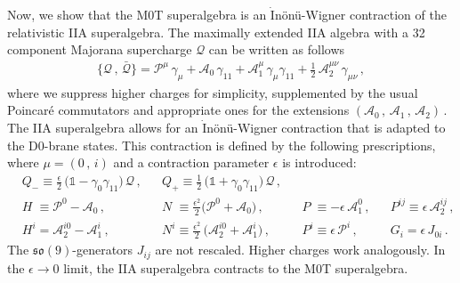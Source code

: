 \documentclass[11pt]{article}
\begin{document}
Now, we show that the M0T superalgebra is an $\dot{\text{I}}$nönü-Wigner contraction of the relativistic IIA superalgebra. The maximally extended IIA algebra with a 32 component Majorana supercharge $\mathcal{Q}$ can be written as follows \cite{Townsend:1997wg}
% 
\begin{align} \label{eq:IIAsuperalgebra}
    \big\{\mathcal{Q}\,,\,\bar{\mathcal{Q}}\big\} = \mathcal{P}^\mu \, \gamma^{}_\mu + \mathcal{A}^{}_0 \, \gamma^{}_{11} + \mathcal{A}_1^\mu \, \gamma^{}_\mu \gamma^{}_{11} + \tfrac12\,\mathcal{A}_2^{\mu\nu}\, \gamma_{\mu\nu}\,,
\end{align}
%
where we suppress higher charges for simplicity,
supplemented by the usual Poincar\'e commutators and appropriate ones for the extensions $(\mathcal A_0\,, \, \mathcal A_1\,, \, \mathcal A_2)$\,. The IIA superalgebra allows for an $\dot{\text{I}}$nönü-Wigner contraction that is adapted to the D0-brane states. This contraction is defined by the following prescriptions, where $\mu=(0\,,\,i)$ and a contraction parameter $\epsilon$ is introduced:
%
\begin{subequations} \label{eq:M0TIW}
\begin{align}
    &Q_- \equiv \tfrac{\epsilon}{2} \, \big(\mathbb{1} -\gamma^{}_0 \gamma^{}_{11}\big) \, \mathcal{Q}\,, && Q_+ \equiv \tfrac{1}{2} \, \big(\mathbb{1} +\gamma^{}_0 \gamma^{}_{11}\big) \, \mathcal{Q}\,, \\[4pt]
    &H^{\phantom i} \equiv \mathcal{P}^0 - \mathcal{A}_0\,,
    && N^{\phantom i} \equiv \tfrac{\epsilon^2}{2}\big(\mathcal{P}^0 + \mathcal{A}_0\big)\,, 
    && P^{\phantom i} \equiv -\epsilon \, \mathcal{A}_1^0\,, 
    &&  P^{ij} \equiv \epsilon \, \mathcal{A}_2^{ij}\,,\\[4pt]
    &H^i = \mathcal{A}_2^{i0} - \mathcal{A}_1^i\,,
    && N^i \equiv \tfrac{\epsilon^2}{2} \, \big(\mathcal{A}_2^{i0} + \mathcal{A}_1^i\big)\,,
    &&P^i \equiv \epsilon\,\mathcal{P}^i \,, 
    && G_i = \epsilon\,J_{0i}\,.  
\end{align}
\end{subequations}
%
The $\mathfrak{so}(9)$-generators $J_{ij}$ are not rescaled. Higher charges work analogously.
In the $\epsilon\to 0$ limit, the IIA superalgebra contracts to the M0T superalgebra. 
\end{document}

